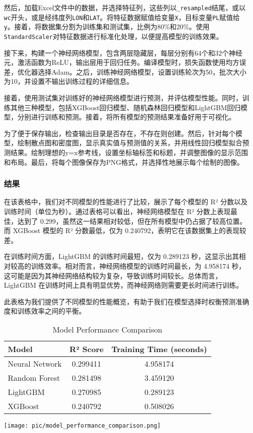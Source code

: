 \documentclass{article}
\begin{document}
然后，加载Excel文件中的数据，并选择特征列，这些列以\texttt{\_resampled}结尾，或以\texttt{wc}开头，或是经纬度列\texttt{LON}和\texttt{LAT}。将特征数据赋值给变量\texttt{X}，目标变量\texttt{PL}赋值给\texttt{y}。接着，将数据集分割为训练集和测试集，比例为80\%和20\%。使用\texttt{StandardScaler}对特征数据进行标准化处理，以便提高模型的训练效果。

接下来，构建一个神经网络模型，包含两层隐藏层，每层分别有64个和32个神经元，激活函数为ReLU，输出层用于回归任务。编译模型时，损失函数使用均方误差，优化器选择Adam。之后，训练神经网络模型，设置训练轮次为50，批次大小为10，并设置不输出训练过程的详细信息。

接着，使用测试集对训练好的神经网络模型进行预测，并评估模型性能。同时，训练其他三种模型，包括XGBoost回归模型、随机森林回归模型和LightGBM回归模型，分别进行训练和预测。接着，将所有模型的预测结果准备好用于可视化。

为了便于保存输出，检查输出目录是否存在，不存在则创建。然后，针对每个模型，绘制散点图和密度图，显示真实值与预测值的关系，并用线性回归模型拟合预测结果。绘制理想的y=x参考线，设置坐标轴标签和标题，并调整图像的显示范围和布局。最后，将每个图像保存为PNG格式，并选择性地展示每个绘制的图像。
\subsubsection{结果}

在该表格中，我们对不同模型的性能进行了比较，展示了每个模型的 R² 分数以及训练时间（单位为秒）。通过表格可以看出，神经网络模型在 R² 分数上表现最佳，达到了 0.299，虽然这一结果相对较低，但在所有模型中仍占据了较高位置。而 XGBoost 模型的 R² 分数最低，仅为 0.240792，表明它在该数据集上的表现较差。

在训练时间方面，LightGBM 的训练时间最短，仅为 0.289123 秒，这显示出其相对较高的训练效率。相对而言，神经网络模型的训练时间最长，为 4.958174 秒，这可能是因为其神经网络结构较为复杂，导致训练时间较长。总体而言，LightGBM 在训练时间上具有明显优势，而神经网络则需要更长时间进行训练。

此表格为我们提供了不同模型的性能概览，有助于我们在模型选择时权衡预测准确度和训练效率之间的平衡。
\par
\begin{table}[ht]
	\centering
	\caption{Model Performance Comparison}
	\begin{tabular}{|l|c|c|}
		\hline
		\textbf{Model} & \textbf{R² Score} & \textbf{Training Time (seconds)} \\
		\hline
		Neural Network  & 0.299411          & 4.958174 \\
		Random Forest   & 0.281498          & 3.459120 \\
		LightGBM        & 0.270985          & 0.289123 \\
		XGBoost         & 0.240792          & 0.508026 \\
		\hline
	\end{tabular}
\end{table}
\texttt{[image: pic/model\_performance\_comparison.png]} %
\end{document}
